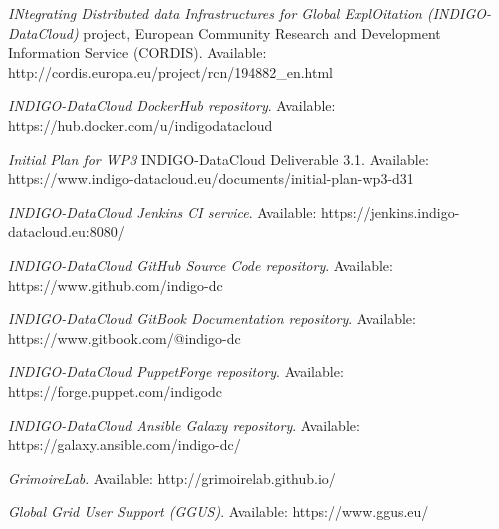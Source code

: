 \documentclass[journal]{IEEEtran}
\begin{document}
\begin{thebibliography}{1}
\emph{INtegrating Distributed data Infrastructures for Global ExplOitation (INDIGO-DataCloud)} project, European Community Research and Development Information Service (CORDIS). Available: http://cordis.europa.eu/project/rcn/194882\_en.html

\emph{INDIGO-DataCloud DockerHub repository}. Available: https://hub.docker.com/u/indigodatacloud

\emph{Initial Plan for WP3} INDIGO-DataCloud Deliverable 3.1. Available: https://www.indigo-datacloud.eu/documents/initial-plan-wp3-d31

\emph{INDIGO-DataCloud Jenkins CI service}. Available: https://jenkins.indigo-datacloud.eu:8080/

\emph{INDIGO-DataCloud GitHub Source Code repository}. Available: https://www.github.com/indigo-dc

\emph{INDIGO-DataCloud GitBook Documentation repository}. Available: https://www.gitbook.com/@indigo-dc

\emph{INDIGO-DataCloud PuppetForge repository}. Available: https://forge.puppet.com/indigodc

\emph{INDIGO-DataCloud Ansible Galaxy repository}. Available: https://galaxy.ansible.com/indigo-dc/

\emph{GrimoireLab}. Available: http://grimoirelab.github.io/

\emph{Global Grid User Support (GGUS)}. Available: https://www.ggus.eu/

\end{thebibliography}



\end{document}

